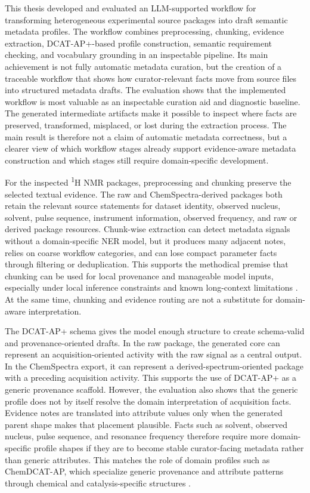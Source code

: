 \label{chap:conclusion}

This thesis developed and evaluated an LLM-supported workflow for transforming heterogeneous experimental source packages into draft semantic metadata profiles.
The workflow combines preprocessing, chunking, evidence extraction, DCAT-AP+-based profile construction, semantic requirement checking, and vocabulary grounding in an inspectable pipeline.
Its main achievement is not fully automatic metadata curation, but the creation of a traceable workflow that shows how curator-relevant facts move from source files into structured metadata drafts.
The evaluation shows that the implemented workflow is most valuable as an inspectable curation aid and diagnostic baseline.
The generated intermediate artifacts make it possible to inspect where facts are preserved, transformed, misplaced, or lost during the extraction process.
The main result is therefore not a claim of automatic metadata correctness, but a clearer view of which workflow stages already support evidence-aware metadata construction and which stages still require domain-specific development.

For the inspected \textsuperscript{1}H \ac{NMR} packages, preprocessing and chunking preserve the selected textual evidence.
The raw and ChemSpectra-derived packages both retain the relevant source statements for dataset identity, observed nucleus, solvent, pulse sequence, instrument information, observed frequency, and raw or derived package resources.
Chunk-wise extraction can detect metadata signals without a domain-specific \ac{NER} model, but it produces many adjacent notes, relies on coarse workflow categories, and can lose compact parameter facts through filtering or deduplication.
This supports the methodical premise that chunking can be used for local provenance and manageable model inputs, especially under local inference constraints and known long-context limitations \cite{liu2024lostmiddle,xu2024ondevice}.
At the same time, chunking and evidence routing are not a substitute for domain-aware interpretation.

The \ac{DCAT-AP+} schema gives the model enough structure to create schema-valid and provenance-oriented drafts.
In the raw package, the generated core can represent an acquisition-oriented activity with the raw signal as a central output.
In the ChemSpectra export, it can represent a derived-spectrum-oriented package with a preceding acquisition activity.
This supports the use of \ac{DCAT-AP+} as a generic provenance scaffold.
However, the evaluation also shows that the generic profile does not by itself resolve the domain interpretation of acquisition facts.
Evidence notes are translated into attribute values only when the generated parent shape makes that placement plausible.
Facts such as solvent, observed nucleus, pulse sequence, and resonance frequency therefore require more domain-specific profile shapes if they are to become stable curator-facing metadata rather than generic attributes.
This matches the role of domain profiles such as ChemDCAT-AP, which specialize generic provenance and attribute patterns through chemical and catalysis-specific structures \cite{stroemert2026chemdcat,chemdcatapDocumentation}.

